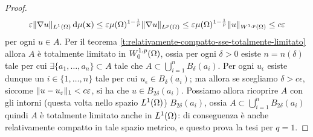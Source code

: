 \begin{proof}
\begin{equation}
        \epsilon\norm{\grad u}_{\leb[1]{\Omega}}\,\dd\mu(\vec x)\le
        \epsilon\mu(\Omega)^{1-\frac1{p}}\norm{\grad u}_{\leb[p]{\Omega}}\le
        \epsilon\mu(\Omega)^{1-\frac1{p}}\norm{u}_{\sobW[1,p]{\Omega}}\le
        c\epsilon
    \end{equation}
    per ogni $u\in A$.
    Per il teorema \ref{t:relativamente-compatto-sse-totalmente-limitato} allora $A$ è totalmente limitato in $\sobWc[1,p]{\Omega}$, ossia per ogni $\delta>0$ esiste $n=n(\delta)$ tale per cui $\exists\{a_1,\dotsc,a_n\}\subset A$ tale che $A\subset\bigcup_{i=1}^nB_\delta(a_i)$.
    Per ogni $u_\epsilon$ esiste dunque un $i\in\{1,\dotsc,n\}$ tale per cui $u_\epsilon\in B_\delta(a_i)$; ma allora se scegliamo $\delta>c\epsilon$, siccome $\norm{u-u_\epsilon}_1<c\epsilon$, si ha che $u\in B_{2\delta}(a_i)$.
    Possiamo allora ricoprire $A$ con gli intorni (questa volta nello spazio $\leb[1]{\Omega}$) $B_{2\delta}(a_i)$, ossia $A\subset\bigcup_{i=1}^nB_{2\delta}(a_i)$ quindi $A$ è totalmente limitato anche in $\leb[1]{\Omega}$: di conseguenza è anche relativamente compatto in tale spazio metrico, e questo prova la tesi per $q=1$.


\end{proof}
